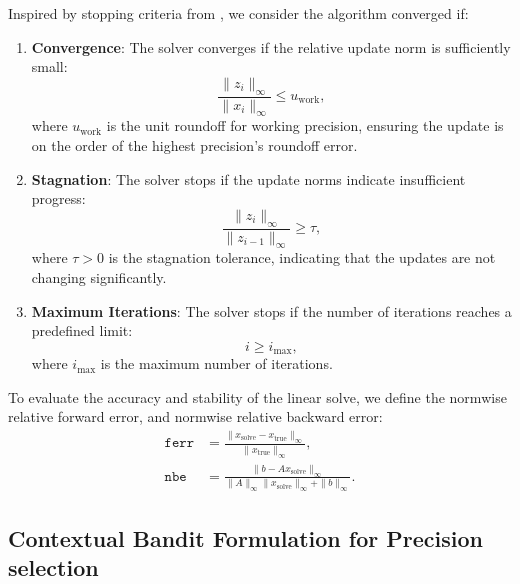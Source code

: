 \documentclass[Afour,sageh,times]{sagej}
\theoremstyle{plain}
\theoremstyle{definition}
\begin{document}
Inspired by stopping criteria from \cite{10.1145/1141885.1141894}, we consider the algorithm converged if:
\begin{enumerate}
    \item \textbf{Convergence}: The solver converges if the relative update norm is sufficiently small:
    \begin{equation}
    \label{eq:stop_convergence}
    \frac{\|z_i\|_\infty}{\|x_i\|_\infty} \leq u_{\text{work}},
    \end{equation}
    where $u_{\text{work}}$ is the unit roundoff for working precision, ensuring the update is on the order of the highest precision's roundoff error.
    \item \textbf{Stagnation}: The solver stops if the update norms indicate insufficient progress:
    \begin{equation}
    \label{eq:stop_stagnation}
    \frac{\|z_i\|_\infty}{\|z_{i-1}\|_\infty} \geq \tau,
    \end{equation}
    where $\tau > 0$ is the stagnation tolerance, indicating that the updates are not changing significantly.
    \item \textbf{Maximum Iterations}: The solver stops if the number of iterations reaches a predefined limit:
    \begin{equation}
    \label{eq:stop_max_iter}
    i \geq i_{\text{max}},
    \end{equation}
    where $i_{\text{max}}$ is the maximum number of iterations.
\end{enumerate}

To evaluate the accuracy and stability of the linear solve, we define the normwise relative forward error, and normwise relative backward error:
\begin{equation}\label{eq:rela_err}
\begin{aligned}
\texttt{ferr} &=
\frac{\|x_{\text{solve}} - x_{\text{true}}\|_\infty}{\|x_{\text{true}}\|_\infty}, \\
\texttt{nbe} &=
\frac{\|b - A x_{\text{solve}}\|_\infty}
{\|A\|_\infty \|x_{\text{solve}}\|_\infty + \|b\|_\infty}.
\end{aligned}
\end{equation}

\subsection{Contextual Bandit Formulation for Precision selection}
\label{subsec:gmres_bandit}
\end{document}

